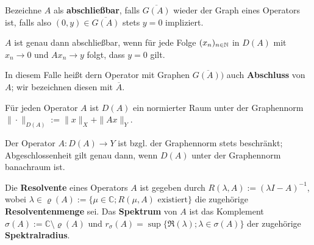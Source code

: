 Bezeichne $A$ als \label{Operator!abschließbar}\textbf{abschließbar}, falls $\overline{G(A)}$ wieder der Graph eines Operators ist, falls also $(0,y)\in\overline{G(A)}$ stets $y=0$ impliziert.

\begin{prop}
$A$ ist genau dann abschließbar, wenn für jede Folge $(x_n)_{n\in\mathbb{N}}$ in $D(A)$ mit $x_n\to 0$ und $Ax_n\to y$ folgt, dass $y=0$ gilt.
\end{prop}

\par
In diesem Falle heißt dern Operator mit Graphen $\overline{G(A))}$ auch \label{Operator!Abschluss}\textbf{Abschluss} von $A$; wir bezeichnen diesen mit $\overline{A}$.

\par
Für jeden Operator $A$ ist $D(A)$ ein normierter Raum unter der Graphennorm $\|\cdot\|_{D(A)}:=\|x\|_X + \|Ax\|_Y$.

\par
Der Operator  $A\colon D(A)\to Y$ ist bzgl. der Graphennorm stets beschränkt; Abgeschlossenheit gilt genau dann, wenn $D(A)$ unter der Graphennorm banachraum ist. 



 





\par 
Die \textbf{Resolvente} eines Operators $A$ ist gegeben durch $R(\lambda, A):=(\lambda I- A)^{-1}$, wobei $\lambda\in \varrho(A):=\{\mu \in \mathbb C; R(\mu, A)\text{ existiert}\}$ die zugehörige \textbf{Resolventenmenge} sei. Das \textbf{Spektrum} von $A$ ist das Komplement $\sigma(A):=\mathbb C\setminus \varrho(A)$ und $r_\sigma(A)=\sup\{\mathfrak R(\lambda); \lambda\in \sigma(A)\}$ der zugehörige \textbf{Spektralradius}. 

